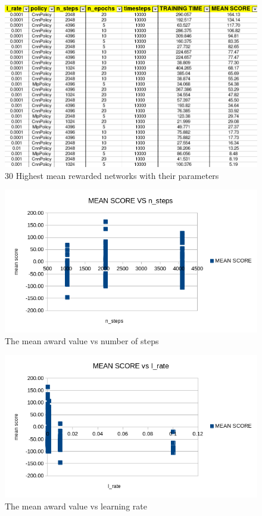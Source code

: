 \documentclass[runningheads]{llncs}
\begin{document}
\begin{figure}
  \includegraphics[width=\textwidth]{Screenshots/best30.png}
  \caption{30 Highest mean rewarded networks with their parameters}
  \label{fig:results}
\end{figure}

\begin{figure}
  \includegraphics[width=\textwidth]{Screenshots/mean_vs_time.png}
  \caption{The mean award value vs number of steps}
  \label{fig:steps}
\end{figure}

\begin{figure}
  \includegraphics[width=\textwidth]{Screenshots/mean_vs_epochs.png}
  \caption{The mean award value vs learning rate}
  \label{fig:rate}
\end{figure}
\end{document}
